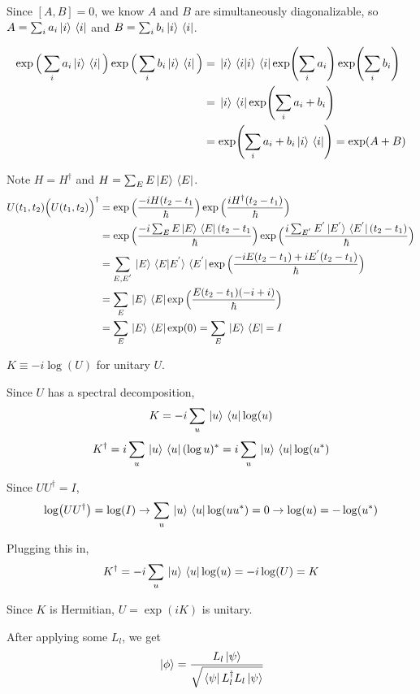 \exercise
Since $[A, B] = 0$, we know $A$ and $B$ are simultaneously diagonalizable, so $A = \sum_{i} a_{i} \ket*{i} \bra*{i}$ and $B = \sum_{i} b_{i} \ket*{i} \bra*{i}$. 

$$
\begin{aligned}
\exp \Big( \sum_{i} a_{i} \ket*{i} \bra*{i} \Big) \exp \Big( \sum_{i} b_{i} \ket*{i} \bra*{i} \Big) &= \ket*{i} \bra*{i} \ket*{i} \bra*{i}  \exp (\sum_{i} a_{i} ) \exp (\sum_{i} b_{i})  \\
&=\ket*{i} \bra*{i} \exp ( \sum_{i} a_{i} + b_{i} )\\
&= \exp (\sum_{i} a_{i} + b_{i} \ket*{i} \bra*{i} ) = \exp(A + B)
\end{aligned}
$$

\exercise
Note $H = H^{\dagger}$ and $H = \sum_{E} E \ket*{E} \bra*{E}$. 
$$
\begin{aligned}
U(t_{1}, t_{2}) \Big( U(t_{1}, t_{2}) \Big)^{\dagger} &= \exp \Big( \frac{-i H(t_{2} - t_{1}}{\hbar} \Big) \exp \Big( \frac{i H^{\dagger} (t_{2} - t_{1})}{\hbar} \Big) \\
&= \exp \Big( \frac{-i \sum_{E} E \ket*{E} \bra*{E} (t_{2} - t_{1}}{\hbar} \Big) \exp \Big( \frac{i \sum_{E^{'}} E^{'} \ket*{E^{'}} \bra*{E^{'}} (t_{2} - t_{1})}{\hbar} \Big) \\
&= \sum_{E, E^{'}} \ket*{E} \bra*{E} \ket*{E^{'}} \bra*{E^{'}} \exp \Big( \frac{-i E(t_{2} - t_{1}) + i E^{'} (t_{2} - t_{1})}{\hbar} \Big) \\
&= \sum_{E} \ket*{E} \bra*{E} \exp \Big( \frac{E(t_{2} - t_{1}) (-i + i)}{\hbar} \Big) \\
&= \sum_{E} \ket*{E} \bra*{E} \exp(0) = \sum_{E} \ket*{E} \bra*{E} = I
\end{aligned}
$$

\exercise

$K \equiv -i \log (U)$ for unitary $U$. 

Since $U$ has a spectral decomposition, 
$$ K = -i \sum_{u} \ket*{u} \bra*{u} \log(u)$$
$$K^{\dagger} = i \sum_{u} \ket*{u} \bra*{u} (\log u)^{*} = i \sum_{u} \ket*{u} \bra*{u} \log (u^{*})$$

Since $UU^{\dagger} = I$, 
$$ \log(UU^{\dagger}) = \log(I) \rightarrow \sum_{u} \ket*{u} \bra*{u} \log(uu^{*}) = 0 \rightarrow \log(u) = -\log(u^{*})$$

Plugging this in, 
$$K^{\dagger} = -i \sum_{u} \ket*{u} \bra*{u} \log(u) = -i \log(U) = K$$

Since $K$ is Hermitian, $U = \exp (iK)$ is unitary.  

\exercise
After applying some $L_{l}$, we get 
$$\ket*{\phi} = \frac{L_{l} \ket*{\psi}}{\sqrt{\bra*{\psi} L_{l}^{\dagger} L_{l} \ket*{\psi}}}$$

